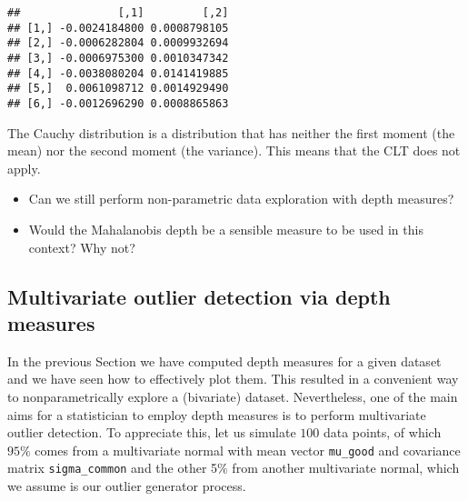 \documentclass[
]{article}
\providecommand{\tightlist}{%
  \setlength{\itemsep}{0pt}\setlength{\parskip}{0pt}}
\begin{document}
\begin{verbatim}
##               [,1]         [,2]
## [1,] -0.0024184800 0.0008798105
## [2,] -0.0006282804 0.0009932694
## [3,] -0.0006975300 0.0010347342
## [4,] -0.0038080204 0.0141419885
## [5,]  0.0061098712 0.0014929490
## [6,] -0.0012696290 0.0008865863
\end{verbatim}

The Cauchy distribution is a distribution that has neither the first
moment (the mean) nor the second moment (the variance). This means that
the CLT does not apply.

\begin{itemize}
\tightlist
\item
  Can we still perform non-parametric data exploration with depth
  measures?
\item
  Would the Mahalanobis depth be a sensible measure to be used in this
  context? Why not?
\end{itemize}

\hypertarget{multivariate-outlier-detection-via-depth-measures}{%
\subsection{Multivariate outlier detection via depth
measures}\label{multivariate-outlier-detection-via-depth-measures}}

In the previous Section we have computed depth measures for a given
dataset and we have seen how to effectively plot them. This resulted in
a convenient way to nonparametrically explore a (bivariate) dataset.
Nevertheless, one of the main aims for a statistician to employ depth
measures is to perform multivariate outlier detection. To appreciate
this, let us simulate \(100\) data points, of which \(95\%\) comes from
a multivariate normal with mean vector \texttt{mu\_good} and covariance
matrix \texttt{sigma\_common} and the other 5\% from another
multivariate normal, which we assume is our outlier generator process.
\end{document}
